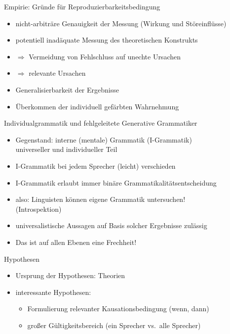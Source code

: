 \begin{frame}
  {Empirie: Gründe für Reproduzierbarkeitsbedingung}
  \begin{itemize}[<+->]
    \item nicht-arbiträre Genauigkeit der Messung (Wirkung und Störeinflüsse)
    \item potentiell inadäquate Messung des theoretischen Konstrukts
    \item $\Rightarrow$ Vermeidung von Fehlschluss auf unechte Ursachen
    \item $\Rightarrow$ \alert{relevante Ursachen}
    \item Generalisierbarkeit der Ergebnisse
    \item Überkommen der individuell gefärbten Wahrnehmung
  \end{itemize}
\end{frame}

\begin{frame}
  {Individualgrammatik und fehlgeleitete Generative Grammatiker}
  \begin{itemize}[<+->]
    \item Gegenstand: interne (mentale) Grammatik (I-Grammatik)\\
      universeller und individueller Teil
    \item I-Grammatik bei jedem Sprecher (leicht) verschieden
    \item I-Grammatik erlaubt immer binäre Grammatikalitätsentscheidung
    \item also: \alert{Linguisten können eigene Grammatik untersuchen!}\\
      (Introspektion)
    \item universalistische Aussagen auf Basis solcher Ergebnisse zulässig
    \item \alert{Das ist auf allen Ebenen eine Frechheit!}
  \end{itemize}
\end{frame}

\begin{frame}
  {Hypothesen}
  \begin{itemize}[<+->]
    \item Ursprung der Hypothesen: Theorien
    \item interessante Hypothesen:
      \begin{itemize}[<+->]
	\item Formulierung relevanter Kausationsbedingung (wenn, dann)
	\item großer Gültigkeitsbereich (ein Sprecher vs.\ alle Sprecher)
      \end{itemize}
  \end{itemize}
\end{frame}

